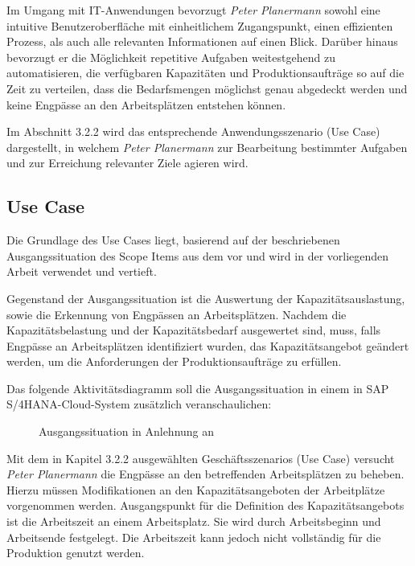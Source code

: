 Im Umgang mit \ac{IT}-Anwendungen bevorzugt \textit{Peter Planermann} sowohl eine intuitive Benutzeroberfläche mit einheitlichem Zugangspunkt, einen effizienten Prozess, als auch alle relevanten Informationen auf einen Blick. Darüber hinaus bevorzugt er die Möglichkeit repetitive Aufgaben weitestgehend zu automatisieren, die verfügbaren Kapazitäten und Produktionsaufträge so auf die Zeit zu verteilen, dass die Bedarfsmengen möglichst genau abgedeckt werden und keine Engpässe an den Arbeitsplätzen entstehen können. 

Im Abschnitt 3.2.2 wird das entsprechende Anwendungsszenario (Use Case) dargestellt, in welchem \textit{Peter Planermann} zur Bearbeitung bestimmter Aufgaben und zur Erreichung relevanter Ziele agieren wird.

\subsection{Use Case}

Die Grundlage des Use Cases liegt, basierend auf der beschriebenen Ausgangssituation des Scope Items  aus dem \citeauthor{SAPBestPracticesExplorer.2018} vor und wird in der vorliegenden Arbeit verwendet und vertieft. 

Gegenstand der Ausgangssituation ist die Auswertung der Kapazitätsauslastung, sowie die Erkennung von Engpässen an Arbeitsplätzen. Nachdem die Kapazitätsbelastung und der Kapazitätsbedarf ausgewertet sind, muss, falls Engpässe an Arbeitsplätzen identifiziert wurden, das Kapazitätsangebot geändert werden, um die Anforderungen der Produktionsaufträge zu erfüllen. \autocite{SAPBestPracticesExplorer.2018}

Das folgende Aktivitätsdiagramm soll die Ausgangssituation in einem in SAP S/4HANA-Cloud-System zusätzlich veranschaulichen:
\begin{figure}[H]
	\centering {}
	\caption[Ausgangssituation]
	{\label{fig:Ausgangssituation} Ausgangssituation in Anlehnung an 
	\autocite{SAPBestPracticesExplorer.2018}}
\end{figure}

Mit dem in Kapitel 3.2.2 ausgewählten Geschäftsszenarios (Use Case) versucht \textit{Peter Planermann} die Engpässe an den betreffenden Arbeitsplätzen zu beheben. Hierzu müssen Modifikationen an den Kapazitätsangeboten der Arbeitplätze vorgenommen werden. Ausgangspunkt für die Definition des Kapazitätsangebots ist die Arbeitszeit an einem Arbeitsplatz. Sie wird durch Arbeitsbeginn und Arbeitsende festgelegt. Die Arbeitszeit kann jedoch nicht vollständig für die Produktion genutzt werden.
\autocite{Dickersbach.2014}

